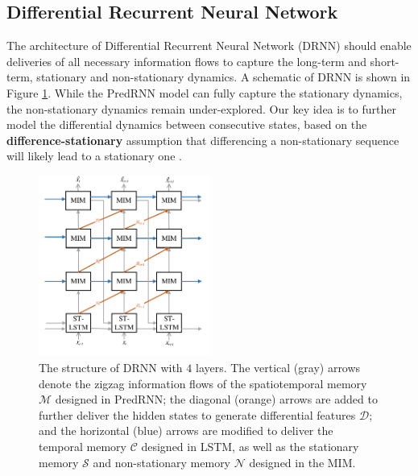 \documentclass[10pt,twocolumn,letterpaper]{article}
\begin{document}
\subsection{Differential Recurrent Neural Network}

The architecture of Differential Recurrent Neural Network (DRNN) should enable deliveries of all necessary information flows to capture the long-term and short-term, stationary and non-stationary dynamics. A schematic of DRNN is shown in Figure \ref{fig:structure}. While the PredRNN model can fully capture the stationary dynamics, the non-stationary dynamics remain under-explored. Our key idea is to further model the differential dynamics between consecutive states, based on the \textbf{difference-stationary} assumption that differencing a non-stationary sequence will likely lead to a stationary one \citep{percival1993spectral}.

\begin{figure}[tbh]
  \centering
  \includegraphics[width=0.5\textwidth]{fig/structure.pdf}
  \caption{The structure of DRNN with $4$ layers. The vertical (gray) arrows denote the zigzag information flows of the spatiotemporal memory $\mathcal{M}$ designed in PredRNN; the diagonal (orange) arrows are added to further deliver the hidden states to generate differential features $\mathcal{D}$; and the horizontal (blue) arrows are modified to deliver the temporal memory $\mathcal{C}$ designed in LSTM, as well as the stationary memory $\mathcal{S}$ and non-stationary memory $\mathcal{N}$ designed in the MIM. %
  }
  \label{fig:structure}
\end{figure}
\end{document}
